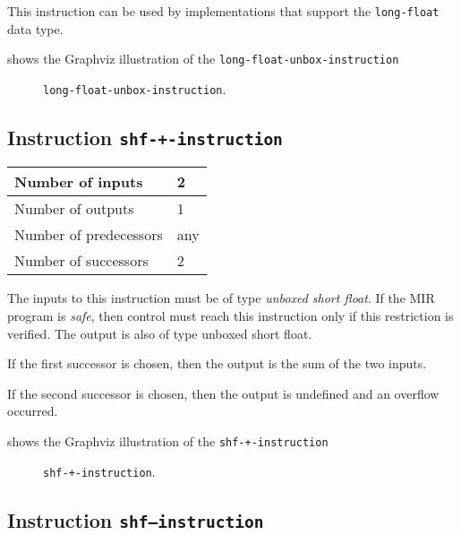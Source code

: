 This instruction can be used by implementations that support the
\texttt{long-float} data type.   

 shows the Graphviz illustration of the
\texttt{long-float-unbox-instruction}

\begin{figure}
\begin{center}
\end{center}
\caption{\label{fig-long-float-unbox-instruction}
\texttt{long-float-unbox-instruction}.}
\end{figure}

\subsection{Instruction \texttt{shf-+-instruction}}
\label{mir-instruction-shf-+}

\begin{tabular}{|l|l|}
\hline
Number of inputs & 2\\
\hline
Number of outputs & 1\\
\hline
Number of predecessors & any\\
\hline
Number of successors & 2\\
\hline
\end{tabular}

The inputs to this instruction must be of type \emph{unboxed short
  float}.  If the MIR program is \emph{safe}, then control must reach
this instruction only if this restriction is verified.  The output is
also of type unboxed short float.

If the first successor is chosen, then the output is
the sum of the two inputs.  

If the second successor is chosen, then the output is undefined and an
overflow occurred. 

 shows the Graphviz illustration of the
\texttt{shf-+-instruction}

\begin{figure}
\begin{center}
\end{center}
\caption{\label{fig-shf-+-instruction}
\texttt{shf-+-instruction}.}
\end{figure}

\subsection{Instruction \texttt{shf---instruction}}
\label{mir-instruction-shf--}


